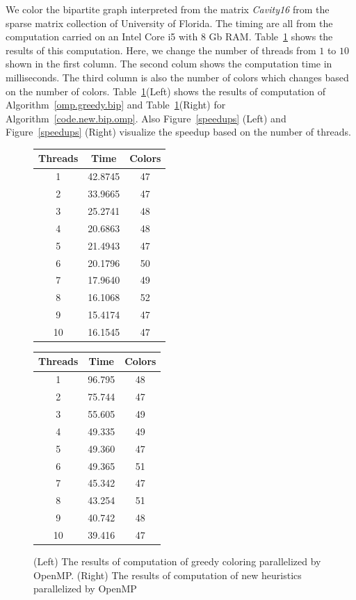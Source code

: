 \documentclass[11pt, twoside,a4paper]{book}
\newcommand{\figref}[1]{Figure~\protect\ref{#1}}
\newcommand{\coderef}[1]{Algorithm~\protect\ref{#1}}
\begin{document}
We color the bipartite graph interpreted from the matrix \textit{Cavity16}
from the sparse matrix collection of University of Florida.
The timing are all from the computation carried on an Intel Core i5 with 8 Gb RAM.
Table~\ref{omp.res} shows the results of this computation.
Here, we change the number of threads from $1$ to $10$ shown in the first column.
The second colum shows the computation time in milliseconds. The third column
is also the number of colors which changes based on the number of colors.
Table~\ref{omp.res}(Left) shows the results of computation of \coderef{omp.greedy.bip}
and Table~\ref{omp.res}(Right) for \coderef{code.new.bip.omp}.
Also \figref{speedups} (Left) and \figref{speedups} (Right) visualize the speedup
based on the number of threads.
\begin{figure}
\begin{tabular}{|c|c|c|}
\hline
Threads & Time & Colors \\\hline
1 & 42.8745 & 47 \\\hline
2 & 33.9665 & 47 \\\hline
3 & 25.2741 & 48 \\\hline
4 & 20.6863 & 48 \\\hline
5 & 21.4943 & 47 \\\hline
6 & 20.1796 & 50 \\\hline
7 & 17.9640 & 49 \\\hline
8 & 16.1068 & 52 \\\hline
9 & 15.4174 & 47 \\\hline
10 & 16.1545 & 47 \\\hline
\end{tabular}\hfill
\begin{tabular}{|c|c|c|}
\hline
Threads & Time & Colors \\\hline
1 & 96.795 & 48 \\\hline
2 & 75.744 & 47 \\\hline
3 & 55.605 & 49 \\\hline
4 & 49.335 & 49 \\\hline
5 & 49.360 & 47 \\\hline
6 & 49.365 & 51 \\\hline
7 & 45.342 & 47 \\\hline
8 & 43.254 & 51 \\\hline
9 & 40.742 & 48 \\\hline
10 & 39.416 & 47 \\\hline
\end{tabular}
\caption{
(Left) The results of computation of greedy coloring parallelized by OpenMP.
(Right) The results of computation of new heuristics parallelized by OpenMP}
\label{omp.res}
\end{figure}
\end{document}
